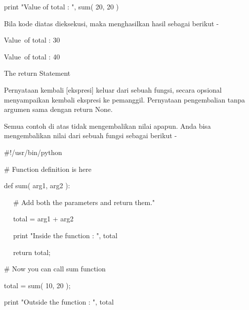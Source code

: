 \noindent 
 \hspace*{0.5in} print "Value of total : ", sum( 20, 20 ) \par
\noindent 
Bila kode diatas dieksekusi, maka menghasilkan hasil sebagai berikut - \par
\noindent 
 \hspace*{0.5in} Value~of total :  30 \par
\noindent 
 \hspace*{0.5in} Value~of total :  40 \par
\vspace{12pt}
\noindent 
The $  $return $  $Statement \par
\noindent 
Pernyataan kembali [ekspresi] keluar dari sebuah fungsi, secara opsional menyampaikan kembali ekspresi ke pemanggil. Pernyataan pengembalian tanpa argumen sama dengan return None. \par
\noindent 
Semua contoh di atas tidak mengembalikan nilai apapun. Anda bisa mengembalikan nilai dari sebuah fungsi sebagai berikut - \par
\noindent 
 \hspace*{0.5in}  $  \#  $!/usr/bin/python \par
\vspace{12pt}
\noindent 
 \hspace*{0.5in}  $  \#  $ Function definition is here \par
\noindent 
 \hspace*{0.5in} def sum( arg1, arg2 ): \par
\noindent 
 \hspace*{0.5in} ~~  $  \#  $ Add both the parameters and return them." \par
\noindent 
 \hspace*{0.5in} ~~ total = arg1 + arg2 \par
\noindent 
 \hspace*{0.5in} ~~ print "Inside the function : ", total \par
\noindent 
 \hspace*{0.5in} ~~ return total; \par
\vspace{12pt}
\noindent 
 \hspace*{0.5in}  $  \#  $ Now you can call sum function \par
\noindent 
 \hspace*{0.5in} total = sum( 10, 20 ); \par
\noindent 
 \hspace*{0.5in} print "Outside the function : ", total  \par
